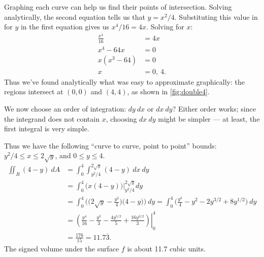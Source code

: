 {Graphing each curve can help us find their points of intersection. Solving analytically, the second equation tells us that $y=x^2/4$. Substituting this value in for $y$ in the first equation gives us $x^4/16 = 4x$. Solving for $x$:
\begin{align*}
\frac{x^4}{16} &= 4x\\
x^4-64x &=0\\
x(x^3-64) &=0\\
x&= 0,\ 4.
\end{align*}
Thus we've found analytically what was easy to approximate graphically: the regions intersect at $(0,0)$ and $(4,4)$, as shown in \autoref{fig:double4}. 

We now choose an order of integration: $dy\ dx$ or $dx\ dy$? Either order works; since the integrand does not contain $x$, choosing $dx\ dy$ might be simpler --- at least, the first integral is very simple.

Thus we have the following ``curve to curve, point to point'' bounds: $y^2/4\leq x\leq 2\sqrt y$, and $0\leq y\leq 4$. 
\begin{align*}
\iint_R (4-y)\ dA &= \int_0^4\int_{y^2/4}^{2\sqrt{y}}(4-y)\ dx\ dy\\
				&= \int_0^4 \big(x(4-y)\big)\Big|_{y^2/4}^{2\sqrt{y}} dy\\
				&= \int_0^4 \Big(\big(2\sqrt{y}-\frac{y^2}{4}\big)\big(4-y)\Big)\ dy = \int_0^4 \Big( \frac{y^3}{4}-y^2-2y^{3/2}+8y^{1/2}\Big)\ dy\\
				&= \left.\left(\frac{y^4}{16}-\frac{y^3}{3}-\frac{4y^{5/2}}5+\frac{16y^{3/2}}3\right)\right|_0^4\\
				&= \frac{176}{15} = 11.7\overline{3}.
\end{align*}
The signed volume under the surface $f$ is about 11.7 cubic units.}

